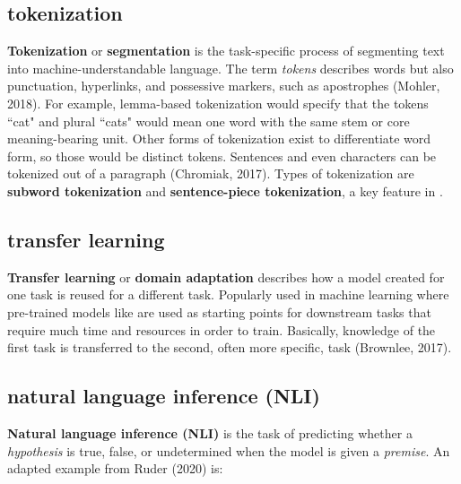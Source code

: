 \subsection{tokenization} \label{nlptask:tokenization}

\textbf{Tokenization} or \textbf{segmentation} is the task-specific process of segmenting text into machine-understandable language. The term \emph{tokens} describes words but also punctuation, hyperlinks, and possessive markers, such as apostrophes (Mohler, 2018). For example, lemma-based tokenization would specify that the tokens ``cat" and plural ``cats" would mean one word with the same stem or core meaning-bearing unit. Other forms of tokenization exist to differentiate word form, so those would be distinct tokens. Sentences and even characters can be tokenized out of a paragraph (Chromiak, 2017). Types of tokenization are \textbf{subword tokenization} and \textbf{sentence-piece tokenization}, a key feature in . 


\subsection{transfer learning} \label{nlptask:transferlearning}

\textbf{Transfer learning} or \textbf{domain adaptation} describes how a model created for one task is reused for a different task. Popularly used in machine learning where pre-trained models like  are used as starting points for downstream tasks that require much time and resources in order to train. Basically, knowledge of the first task is transferred to the second, often more specific, task (Brownlee, 2017).


\subsection{natural language inference (NLI)} \label{nlptask:naturallanguageinferenceNLI}

\textbf{Natural language inference (NLI)} is the task of predicting whether a \emph{hypothesis} is true, false, or undetermined when the model is given a \emph{premise}. An adapted example from  Ruder (2020) is: 





